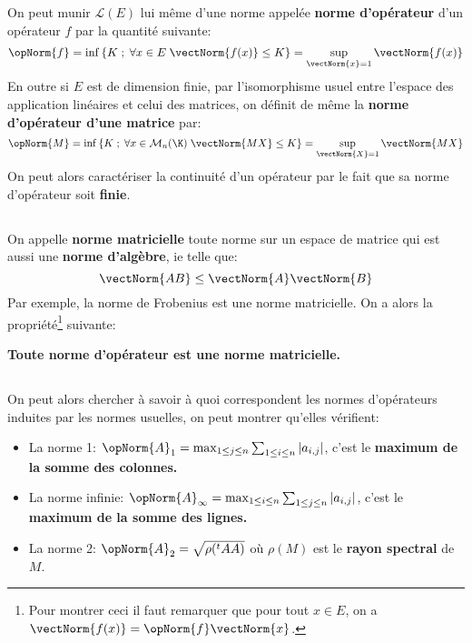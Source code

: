 \subsection*{}
On peut munir \( \mathcal{L}(E) \) lui même d'une norme appelée \textbf{norme d'opérateur} d'un opérateur \(f\) par la quantité suivante:
\[
   \opNorm{f} = \inf \left\{ K \; ; \; \forall x \in E \; \vectNorm{f(x)} \leq K \right\} = \sup_{\vectNorm{x} = 1} \vectNorm{f(x)}
\]
En outre si \( E \) est de dimension finie, par l'isomorphisme usuel entre l'espace des application linéaires et celui des matrices, on définit de même la \textbf{norme d'opérateur d'une matrice} par:
\[
   \opNorm{M} = \inf \left\{ K \; ; \; \forall x \in \mathcal{M}_n(\K) \; \vectNorm{MX} \leq K \right\} = \sup_{\vectNorm{X} = 1} \vectNorm{MX}
\]
On peut alors caractériser la continuité d'un opérateur par le fait que sa norme d'opérateur soit \textbf{finie}.
\subsection*{}
On appelle \textbf{norme matricielle} toute norme sur un espace de matrice qui est aussi une \textbf{norme d'algèbre}, ie telle que:
\[
   \vectNorm{AB} \leq \vectNorm{A}\vectNorm{B}
\]
Par exemple, la norme de Frobenius est une norme matricielle. On a alors la propriété\footnote[1]{Pour montrer ceci il faut remarquer que pour tout \(x \in E\), on a \(\vectNorm{f(x)} = \opNorm{f}\vectNorm{x}\).} suivante:
\begin{center}
   \textbf{Toute norme d'opérateur est une norme matricielle.}
\end{center}
\subsection*{}
On peut alors chercher à savoir à quoi correspondent les normes d'opérateurs induites par les normes usuelles, on peut montrer qu'elles vérifient:
\begin{itemize}
   \item La norme 1: \(\opNorm{A}_{1} = \max_{1 \leq j \leq n} \sum_{1 \leq i \leq n} |a_{i,j}|\), c'est le \textbf{maximum de la somme des colonnes.}
   \item La norme infinie: \(\opNorm{A}_{\infty} = \max_{1 \leq i \leq n} \sum_{1 \leq j \leq n} |a_{i,j}|\), c'est le \textbf{maximum de la somme des lignes.}
   \item La norme 2: \(\opNorm{A}_{2} = \sqrt{\rho({}^tAA)}\) où \(\rho(M)\) est le \textbf{rayon spectral} de \(M\).
\end{itemize}

